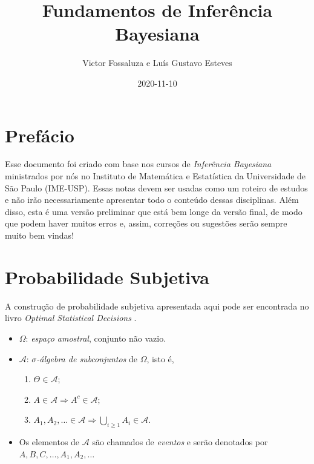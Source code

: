 \documentclass[
]{book}
\title{Fundamentos de Inferência Bayesiana}
\author{Victor Fossaluza e Luís Gustavo Esteves}
\date{2020-11-10}
\providecommand{\tightlist}{%
  \setlength{\itemsep}{0pt}\setlength{\parskip}{0pt}}
\begin{document}
\maketitle

{
\setcounter{tocdepth}{1}
\tableofcontents
}
\hypertarget{prefuxe1cio}{%
\chapter{Prefácio}\label{prefuxe1cio}}

Esse documento foi criado com base nos cursos de \emph{Inferência Bayesiana} ministrados por nós no Instituto de Matemática e Estatística da Universidade de São Paulo (IME-USP). Essas notas devem ser usadas como um roteiro de estudos e não irão necessariamente apresentar todo o conteúdo dessas disciplinas. Além disso, esta é uma versão preliminar que está bem longe da versão final, de modo que podem haver muitos erros e, assim, correções ou sugestões serão sempre muito bem vindas!

\hypertarget{ProbSubj}{%
\chapter{Probabilidade Subjetiva}\label{ProbSubj}}

A construção de probabilidade subjetiva apresentada aqui pode ser encontrada no livro \emph{Optimal Statistical Decisions} \citep{DeGroot70}.

\begin{itemize}
\item
  \(\Omega\): \emph{espaço amostral}, conjunto não vazio.
\item
  \(\mathcal{A}\): \emph{\(\sigma\)-álgebra de subconjuntos} de \(\Omega\), isto é,

  \begin{enumerate}
  \def\labelenumi{\arabic{enumi}.}
  \tightlist
  \item
    \(\Theta \in \mathcal{A}\);
  \item
    \(A \in \mathcal{A} \Longrightarrow A^{c} \in \mathcal{A}\);
  \item
    \(\displaystyle A_1, A_2, \ldots \in \mathcal{A} \Longrightarrow \bigcup_{i\geq1} A_i \in \mathcal{A}\).
  \end{enumerate}
\item
  Os elementos de \(\mathcal{A}\) são chamados de \emph{eventos} e serão denotados por \(A, B, C, \ldots, A_1, A_2, \ldots\)
\end{itemize}
\end{document}
